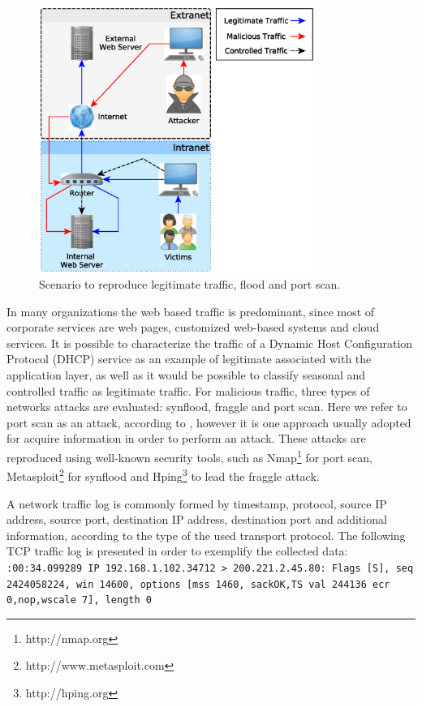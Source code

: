 \begin{figure}[h!]
     \centering 
     \includegraphics[width=9cm]{figures/ch2/scenario.eps}
     \caption{Scenario to reproduce legitimate traffic, flood and port scan.}
     \label{fig:2.01}
\end{figure}

In many organizations the web based traffic is predominant, since most of corporate services are  web pages, customized web-based systems and cloud services. It is possible to characterize the traffic of a Dynamic Host Configuration Protocol (DHCP) service as an example of legitimate associated with the application layer, as well as it would be possible to classify seasonal and controlled traffic as legitimate traffic. For malicious traffic, three types of networks attacks are evaluated: synflood, fraggle and port scan. Here we refer to port scan as an attack, according to \cite{ahmed2016survey, moustafa2019holistic}, however it is one approach usually adopted for acquire information in order to perform an attack. These attacks are reproduced using well-known security tools, such as Nmap\footnote{http://nmap.org} for port scan, Metasploit\footnote{http://www.metasploit.com} for synflood and Hping\footnote{http://hping.org} to lead the fraggle attack.

A network traffic log is commonly formed by timestamp, protocol, source IP address, source port, destination IP address, destination port and additional information, according to the type of the used transport protocol. The following TCP traffic log is presented in order to exemplify the collected data:
\newline
\newline
\texttt{:00:34.099289 IP 192.168.1.102.34712 > 200.221.2.45.80: Flags [S], seq 2424058224, win 14600, options [mss 1460, sackOK,TS val 244136 ecr 0,nop,wscale 7], length 0}
\newline


